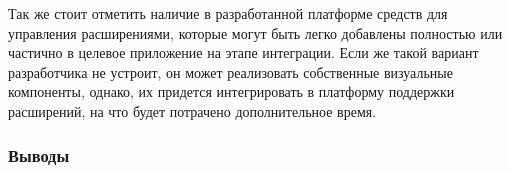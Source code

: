 Так же стоит отметить наличие в разработанной платформе средств для управления расширениями, которые могут быть легко добавлены полностью или частично в целевое приложение на этапе интеграции. Если же такой вариант разработчика не устроит, он может реализовать собственные визуальные компоненты, однако, их придется интегрировать в платформу поддержки расширений, на что будет потрачено дополнительное время.

\subsubsection{Выводы}



\pagebreak
